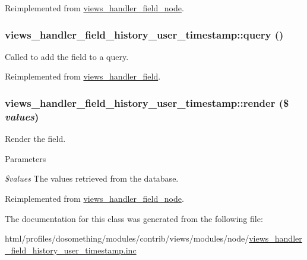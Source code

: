 Reimplemented from \hyperlink{classviews__handler__field__node_af3d8a04be282a20079ea4fb82e768910}{views\_\-handler\_\-field\_\-node}.\hypertarget{classviews__handler__field__history__user__timestamp_abd6ff7a6d51f75781cf6ea6288612c07}{
\subsubsection[{query}]{\setlength{\rightskip}{0pt plus 5cm}views\_\-handler\_\-field\_\-history\_\-user\_\-timestamp::query ()}}
\label{classviews__handler__field__history__user__timestamp_abd6ff7a6d51f75781cf6ea6288612c07}
Called to add the field to a query. 

Reimplemented from \hyperlink{classviews__handler__field_a4f661f91bcbe80d4a00c30a31456c502}{views\_\-handler\_\-field}.\hypertarget{classviews__handler__field__history__user__timestamp_acc2398dad2662ab9d4faf0ea9daba116}{
\subsubsection[{render}]{\setlength{\rightskip}{0pt plus 5cm}views\_\-handler\_\-field\_\-history\_\-user\_\-timestamp::render (\$ {\em values})}}
\label{classviews__handler__field__history__user__timestamp_acc2398dad2662ab9d4faf0ea9daba116}
Render the field.


\begin{DoxyParams}{Parameters}
\item[{\em \$values}]The values retrieved from the database. \end{DoxyParams}


Reimplemented from \hyperlink{classviews__handler__field__node_afe7681e1188ad74ce9b604ad3ba864c0}{views\_\-handler\_\-field\_\-node}.

The documentation for this class was generated from the following file:\begin{DoxyCompactItemize}
\item 
html/profiles/dosomething/modules/contrib/views/modules/node/\hyperlink{views__handler__field__history__user__timestamp_8inc}{views\_\-handler\_\-field\_\-history\_\-user\_\-timestamp.inc}\end{DoxyCompactItemize}
